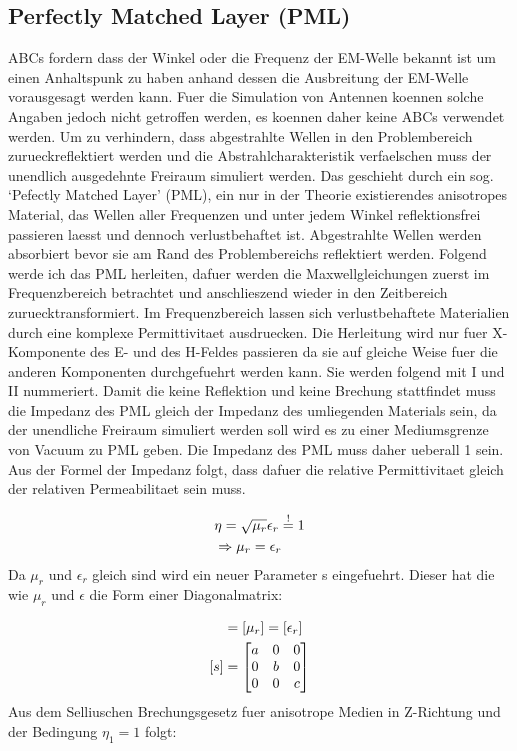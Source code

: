 \documentclass[11pt, ngerman]{article}
\begin{document}
\subsection{Perfectly Matched Layer (PML)}
ABCs fordern dass der Winkel oder die Frequenz der EM-Welle bekannt ist um einen Anhaltspunk zu haben anhand dessen
die Ausbreitung der EM-Welle vorausgesagt werden kann.
Fuer die Simulation von Antennen koennen solche Angaben jedoch nicht getroffen werden, es koennen daher keine ABCs verwendet werden. Um zu verhindern, dass abgestrahlte Wellen in den Problembereich zurueckreflektiert werden und die Abstrahlcharakteristik
verfaelschen muss der unendlich ausgedehnte Freiraum simuliert werden. Das geschieht durch ein sog. `Pefectly Matched Layer'
(PML), ein nur in der Theorie existierendes anisotropes Material, das Wellen aller Frequenzen und unter jedem
Winkel reflektionsfrei passieren laesst und dennoch verlustbehaftet ist\cite{introduction_pml}.
Abgestrahlte Wellen werden absorbiert bevor sie am Rand des Problembereichs reflektiert werden.
Folgend werde ich das PML herleiten, dafuer werden die Maxwellgleichungen zuerst im Frequenzbereich betrachtet
und anschlieszend wieder in den Zeitbereich zuruecktransformiert\cite{derivation_pml}.
Im Frequenzbereich lassen sich verlustbehaftete Materialien durch eine komplexe Permittivitaet ausdruecken.\cite{loss_in_fd}
Die Herleitung wird nur fuer X-Komponente des E- und des H-Feldes passieren da sie auf gleiche Weise fuer die anderen Komponenten
durchgefuehrt werden kann. Sie werden folgend mit I und II nummeriert.
Damit die keine Reflektion und keine Brechung stattfindet muss die Impedanz des PML gleich der Impedanz des umliegenden
Materials sein, da der unendliche Freiraum simuliert werden soll wird es zu einer Mediumsgrenze von Vacuum zu PML
geben. Die Impedanz des PML muss daher ueberall 1 sein.
Aus der Formel der Impedanz folgt, dass dafuer die relative Permittivitaet gleich der relativen Permeabilitaet sein muss.%
\cite{matched_impedance}

\begin{align}
	&\eta = \sqrt{\mu_r}{\epsilon_r} \stackrel{!}{=} 1\\
	&\Rightarrow \mu_r = \epsilon_r
\end{align}
Da \(\mu_r\) und \(\epsilon_r\) gleich sind wird ein neuer Parameter s eingefuehrt.
Dieser hat die wie \(\mu_r\) und \(\epsilon\) die Form einer Diagonalmatrix:

\begin{align}
	[s] &= [\mu_r] = [\epsilon_r]\\
	[s] &= \dt{a}{b}{c}
\end{align}
Aus dem Selliuschen Brechungsgesetz fuer anisotrope Medien in Z-Richtung und der Bedingung \(\eta_1 = 1\) folgt:
\end{document}
